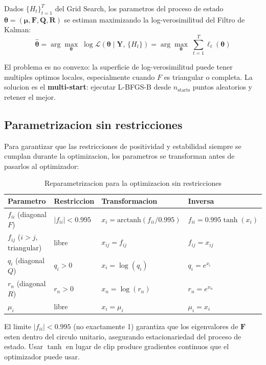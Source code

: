 \documentclass[12pt, a4paper]{article}
\theoremstyle{plain}
\theoremstyle{definition}
\theoremstyle{remark}
\newcommand{\bmu}{\bm{\mu}}
\newcommand{\bY}{\mathbf{Y}}
\newcommand{\bF}{\mathbf{F}}
\newcommand{\bQ}{\mathbf{Q}}
\newcommand{\bR}{\mathbf{R}}
\begin{document}
Dados $\{H_t\}_{t=1}^T$ del Grid Search, los parametros del proceso de estado
$\bm{\theta} = (\bmu, \bF, \bQ, \bR)$ se estiman maximizando la
log-verosimilitud del Filtro de Kalman:
\begin{equation}
  \hat{\bm{\theta}} =
  \arg\max_{\bm{\theta}}\; \log\mathcal{L}(\bm{\theta} \mid \bY,\, \{H_t\})
  = \arg\max_{\bm{\theta}}\; \sum_{t=1}^T \ell_t(\bm{\theta})
  \label{eq:mle}
\end{equation}

El problema es no convexo: la superficie de log-verosimilitud puede tener
multiples optimos locales, especialmente cuando $F$ es triangular o completa.
La solucion es el \textbf{multi-start}: ejecutar L-BFGS-B desde $n_\text{starts}$
puntos aleatorios y retener el mejor.

\subsection{Parametrizacion sin restricciones}

Para garantizar que las restricciones de positividad y estabilidad siempre
se cumplan durante la optimizacion, los parametros se transforman antes
de pasarlos al optimizador:

\begin{table}[H]
\centering
\caption{Reparametrizacion para la optimizacion sin restricciones}
\label{tab:reparam}
\small
\begin{tabular}{L{2.8cm} L{3cm} L{3.5cm} L{4cm}}
\toprule
\textbf{Parametro}
  & \textbf{Restriccion}
  & \textbf{Transformacion}
  & \textbf{Inversa} \\
\midrule
$f_{ii}$ (diagonal $F$)
  & $|f_{ii}| < 0.995$
  & $x_i = \text{arctanh}(f_{ii}/0.995)$
  & $f_{ii} = 0.995\tanh(x_i)$ \\
\addlinespace
$f_{ij}$ ($i > j$, triangular)
  & libre
  & $x_{ij} = f_{ij}$
  & $f_{ij} = x_{ij}$ \\
\addlinespace
$q_i$ (diagonal $Q$)
  & $q_i > 0$
  & $x_i = \log(q_i)$
  & $q_i = e^{x_i}$ \\
\addlinespace
$r_n$ (diagonal $R$)
  & $r_n > 0$
  & $x_n = \log(r_n)$
  & $r_n = e^{x_n}$ \\
\addlinespace
$\mu_i$
  & libre
  & $x_i = \mu_i$
  & $\mu_i = x_i$ \\
\bottomrule
\end{tabular}
\end{table}

El limite $|f_{ii}| < 0.995$ (no exactamente 1) garantiza que los
eigenvalores de $\bF$ esten dentro del circulo unitario, asegurando
estacionariedad del proceso de estado. Usar $\tanh$ en lugar de $\text{clip}$
produce gradientes continuos que el optimizador puede usar.
\end{document}
